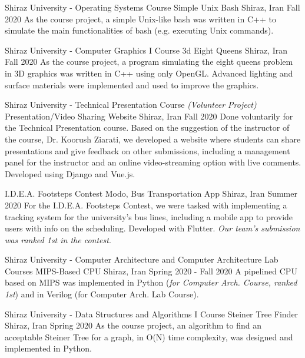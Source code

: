 \begin{cventries}
  \cventry
    {Shiraz University - Operating Systems Course} %
    {Simple Unix Bash} %
    {Shiraz, Iran} %
    {Fall 2020} %
    {
      As the course project, a simple Unix-like bash was written in C++ to simulate the main functionalities of bash (e.g. executing Unix commands).
    }

  \cventry
    {Shiraz University - Computer Graphics I Course} %
    {3d Eight Queens} %
    {Shiraz, Iran} %
    {Fall 2020} %
    {
      As the course project, a program simulating the eight queens problem in 3D graphics was written in C++ using only OpenGL. Advanced lighting and surface materials were implemented and used to improve the graphics.
    }

  \cventry
    {Shiraz University - Technical Presentation Course \emph{(Volunteer Project)}} %
    {Presentation/Video Sharing Website} %
    {Shiraz, Iran} %
    {Fall 2020} %
    {
      Done voluntarily for the Technical Presentation course. Based on the suggestion of the instructor of the course, Dr. Koorush Ziarati, we developed a website where students can share presentations and give feedback on other submissions, including a management panel for the instructor and an online video-streaming option with live comments. Developed using Django and Vue.js.
    }

  \cventry
    {I.D.E.A. Footsteps Contest} %
    {Modo, Bus Transportation App} %
    {Shiraz, Iran} %
    {Summer 2020} %
    {
      For the I.D.E.A. Footsteps Contest, we were tasked with implementing a tracking system for the university’s bus lines, including a mobile app to provide users with info on the scheduling. Developed with Flutter. \emph{Our team’s submission was ranked 1st in the contest}.
    }

  \cventry
    {Shiraz University - Computer Architecture and Computer Architecture Lab Courses} %
    {MIPS-Based CPU} %
    {Shiraz, Iran} %
    {Spring 2020 - Fall 2020} %
    {
      A pipelined CPU based on MIPS was implemented in Python (\emph{for Computer Arch. Course, ranked 1st}) and in Verilog (for Computer Arch. Lab Course).
    }

  \cventry
    {Shiraz University - Data Structures and Algorithms I Course} %
    {Steiner Tree Finder} %
    {Shiraz, Iran} %
    {Spring 2020} %
    {
      As the course project, an algorithm to find an acceptable Steiner Tree for a graph, in O(N) time complexity, was designed and implemented in Python.
    }


\end{cventries}
